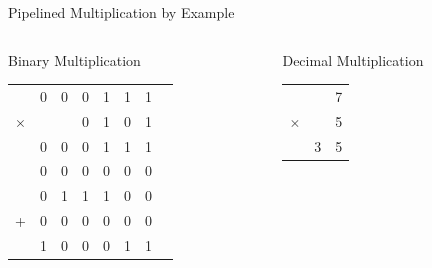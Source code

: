 \documentclass[dvipsnames]{beamer}
\begin{document}
\begin{frame}{Pipelined Multiplication by Example}
	\setlength{\tabcolsep}{2pt}
	\begin{columns}
		\begin{column}[T]{0.45\textwidth}
			\begin{block}{Binary Multiplication}
				\begin{tabular}{cccccccc}
								& 0 & 0 & 0 & 1 & 1 & 1 \\
					$\times$	&   &   & 0 & 1 & 0 & 1 \\ \hline
								& 0 & 0 & 0 & 1 & 1 & 1 \\
								& 0 & 0 & 0 & 0 & 0 & 0 \\
								& 0 & 1 & 1 & 1 & 0 & 0 \\
						+		& 0 & 0 & 0 & 0 & 0 & 0 \\ \hline
								& 1 & 0 & 0 & 0 & 1 & 1 
				\end{tabular}
			\end{block}
		\end{column}
		\begin{column}[T]{0.45\textwidth}
			\begin{block}{Decimal Multiplication}
				\begin{tabular}{ccc}
								&   & 7 \\
					$\times$	&   & 5 \\ \hline
								& 3 & 5
				\end{tabular}
			\end{block}
		\end{column}
	\end{columns}
\end{frame}
\end{document}
